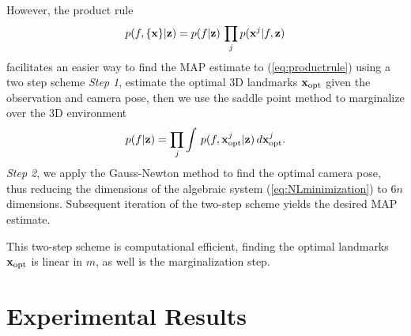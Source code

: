 \documentclass[conference]{IEEEtran}
\newcommand{\beq}{\begin{equation}}
\newcommand{\eeq}{\end{equation}}
\begin{document}
However, the product rule
\beq
    p(f,\{ {\bf x} \}| {\bf z}) = p(f | {\bf z}) \, \prod_j  p({\bf x}^j| f, {\bf z})
    \label{eq:productrule}
\eeq
facilitates an easier way to find the MAP estimate to (\ref{eq:productrule}) using a two step scheme 
{\em Step 1}, estimate the optimal 3D landmarks ${\bf x}_{\rm opt}$ given the observation
and camera pose, then we use the saddle point method to marginalize over the 3D environment
\beq
    p(f | {\bf z}) =\prod_j \int \, p(f,{\bf x}_{\rm opt}^j| {\bf z}) \, d{\bf x}^j_{\rm opt}.
    \label{eq:marginalize}
\eeq
{\em Step 2}, we apply the Gauss-Newton method to find the optimal
camera pose, thus reducing the dimensions of the algebraic system (\ref{eq:NLminimization})
to $6n$ dimensions. Subsequent iteration of the two-step scheme yields the desired MAP estimate.

This two-step scheme is computational efficient, finding the optimal landmarks ${\bf x}_{\rm opt}$
is linear in $m$, as well is the marginalization step. 

\section{Experimental Results}
\end{document}
